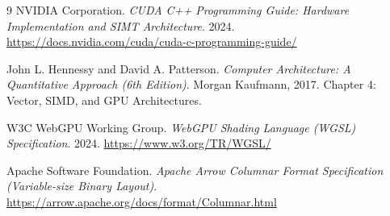 \documentclass[a4paper,11pt]{article}
\begin{document}
\begin{thebibliography}{9}
NVIDIA Corporation. \textit{CUDA C++ Programming Guide: Hardware Implementation and SIMT Architecture}. 2024. \url{https://docs.nvidia.com/cuda/cuda-c-programming-guide/}

John L. Hennessy and David A. Patterson. \textit{Computer Architecture: A Quantitative Approach (6th Edition)}. Morgan Kaufmann, 2017. Chapter 4: Vector, SIMD, and GPU Architectures.

W3C WebGPU Working Group. \textit{WebGPU Shading Language (WGSL) Specification}. 2024. \url{https://www.w3.org/TR/WGSL/}

Apache Software Foundation. \textit{Apache Arrow Columnar Format Specification (Variable-size Binary Layout)}. \url{https://arrow.apache.org/docs/format/Columnar.html}
\end{thebibliography}
\end{document}
